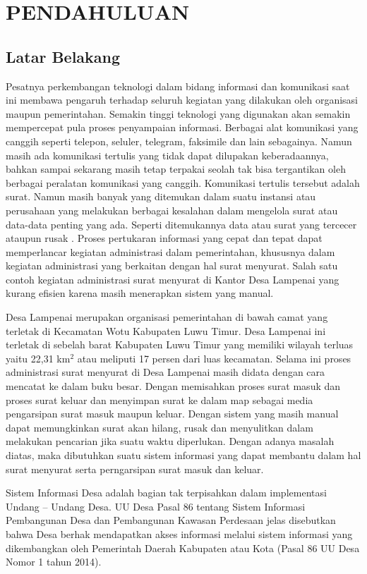 \chapter{PENDAHULUAN}

\section{Latar Belakang}

Pesatnya perkembangan teknologi dalam bidang informasi dan komunikasi saat ini membawa pengaruh terhadap seluruh kegiatan yang dilakukan oleh organisasi maupun pemerintahan. Semakin tinggi teknologi yang digunakan akan semakin mempercepat pula proses penyampaian informasi. Berbagai alat komunikasi yang canggih seperti telepon, seluler, telegram, faksimile dan lain sebagainya. Namun masih ada komunikasi tertulis yang tidak dapat dilupakan keberadaannya, bahkan sampai sekarang masih tetap terpakai seolah tak bisa tergantikan oleh berbagai peralatan komunikasi yang canggih. Komunikasi tertulis tersebut adalah surat. Namun masih banyak yang ditemukan dalam suatu instansi atau perusahaan yang melakukan berbagai kesalahan dalam mengelola surat atau data-data penting yang ada. Seperti ditemukannya data atau surat yang tercecer ataupun rusak . Proses pertukaran informasi yang cepat dan tepat dapat memperlancar kegiatan administrasi dalam pemerintahan, khususnya dalam kegiatan administrasi yang berkaitan dengan hal surat menyurat. Salah satu contoh kegiatan administrasi surat menyurat di Kantor Desa Lampenai yang kurang efisien karena masih menerapkan sistem yang manual.

Desa Lampenai merupakan organisasi pemerintahan di bawah camat yang terletak di Kecamatan Wotu Kabupaten Luwu Timur. Desa Lampenai ini terletak di sebelah barat Kabupaten Luwu Timur yang memiliki wilayah terluas yaitu 22,31 km$^2$ atau meliputi 17 persen dari luas kecamatan. Selama ini proses administrasi surat menyurat di Desa Lampenai masih didata dengan cara mencatat ke dalam buku besar. Dengan memisahkan proses surat masuk dan proses surat keluar dan menyimpan surat ke dalam map sebagai media pengarsipan surat masuk maupun keluar. Dengan sistem yang masih manual dapat memungkinkan surat akan hilang, rusak dan menyulitkan dalam melakukan pencarian jika suatu waktu diperlukan. Dengan adanya masalah diatas, maka dibutuhkan suatu sistem informasi yang dapat membantu dalam hal surat menyurat serta perngarsipan surat masuk dan keluar.

Sistem Informasi Desa adalah bagian tak terpisahkan dalam implementasi Undang – Undang Desa. UU Desa Pasal 86 tentang Sistem Informasi Pembangunan Desa dan Pembangunan Kawasan Perdesaan jelas disebutkan bahwa Desa berhak mendapatkan akses informasi melalui sistem informasi yang dikembangkan oleh Pemerintah Daerah Kabupaten atau Kota (Pasal 86 UU Desa Nomor 1 tahun 2014).

